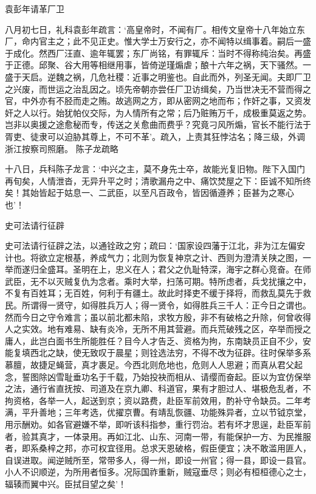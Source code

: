 \documentclass[]{article}
\begin{document}
袁彭年请革厂卫

八月初七日，礼科袁彭年疏言：`高皇帝时，不闻有厂。相传文皇帝十八年始立东厂，命内官主之；此不见正史。惟大学士万安行之，亦不闻特以缉事着。嗣后一盛于成化。然西厂汪直、逾年辄罢；东厂尚铭，有罪辄斥：当时不得称纯治矣。再盛于正德。邱聚、谷大用等相继用事，皆倚逆瑾煽虐；酿十六年之祸，天下骚然。一盛于天启。逆魏之祸，几危社稷：近事之明鉴也。自此而外，列圣无闻。夫即厂卫之兴废，而世运之治乱因之。顷先帝朝亦尝任厂卫访缉矣，乃当世决无不营而得之官，中外亦有不胫而走之贿。故逃网之方，即从密网之地而布；作奸之事，又资发奸之人以行。始犹帕仪交际，为人情所有之常；后乃赃贿万千，成极重莫返之势。岂非以奥援之途愈秘而专，传送之关愈曲而费乎？究竟刁风所煽，官长不能行法于胥吏、徒隶可以迫胁其尊上，不可不革'。疏入，上责其狂悖沽名；降三级，外调浙江按察司照磨。
陈子龙疏略

十八日，兵科陈子龙言：`中兴之主，莫不身先士卒，故能光复旧物。陛下入国门再旬矣，人情泄沓，无异升平之时；清歌漏舟之中、痛饮焚屋之下：臣诚不知所终矣！其始皆起于姑息一、二武臣，以至凡百政令，皆因循遵养；臣甚为之寒心也'！

史可法请行征辟

史可法请行征辟之法，以通铨政之穷；疏曰：`国家设四藩于江北，非为江左偏安计也。将欲立定根基，养成气力；北则为恢复神京之计、西则为澄清关陕之图，一举而遂归全盛耳。圣明在上，忠义在人；君父之仇耻特深，海宇之群心竞奋。在师武臣，无不以灭贼复仇为念者。乘时大举，扫荡可期。特所虑者，兵戈扰攘之中，不复有百姓耳；无百姓，何利于有疆土。故此时择吏不缓于择将，而救乱莫先于救民。所谓得一贤守，如得胜兵万人；得一贤令，如得胜兵三千人：正今日之谓也。然而今日之守令难言；虽以前北都未陷，求牧方殷，非不有破格之升除，何曾收得人之实效。地有难易、缺有炎冷，无所不用其营避。而兵荒破残之区，卒举而授之庸人，此岂白面书生所能胜任？目今人才告乏、资格为拘，东南缺员正自不少，安能复填西北之缺，使无致叹于晨星；则铨选法穷，不得不改为征辟。往时保举多系慕膻，故捷足蝇营，真才裹足。今西北则危地也，危则人人思避；而真从君父起念，誓图除凶雪耻垂功名于千载，乃始投袂而相从、请缨而奋起。臣以为宜仿保举之法，通行省直抚按、司道及在京九卿、科道官，果有才胆过人、堪极危乱者，不拘资格，各举一人，起送到京；资以路费，赴臣军前效用，酌补守令缺员。二年考满，平升善地；三年考选，优擢京曹。有靖乱恢疆、功能殊异者，立以节钺京堂，用示酬劝。如各官避嫌不举，即听该科指参，重行罚治。若有坏才思逞，赴臣军前者，验其真才，一体录用。再如江北、山东、河南一带，有能保护一方、为民推服者，即系桑梓之邦，亦可权宜径用。总求天恩破格，假臣便宜；决不敢滥用匪人，自误进取。闻逆贼所至，常带多人，得一州，即设一州官；得一县，即设一县官。小人不识顺逆，为所用者恒多。况际国祚重新，贼寇垂尽；则必有桓桓德心之士，辐辏而翼中兴。臣拭目望之矣'！
\end{document}
